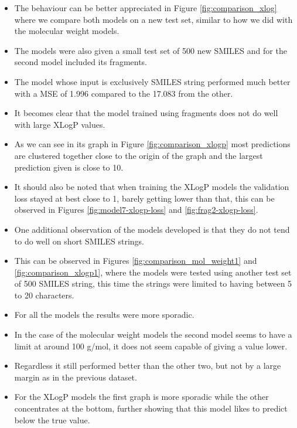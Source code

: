 \begin{itemize}
        \item The behaviour can be better appreciated in Figure \ref{fig:comparison_xlog} where we compare both models on a new test set, similar to how we did with the molecular weight models.
        \item The models were also given a small test set of 500 new SMILES and for the second model included its fragments.
        \item The model whose input is exclusively SMILES string performed much better with a MSE of 1.996 compared to the 17.083 from the other. 
        \item It becomes clear that the model trained using fragments does not do well with large XLogP values.
        \item As we can see in its graph in Figure \ref{fig:comparison_xlogp} most predictions are clustered together close to the origin of the graph and the largest prediction given is close to 10.
        \item It should also be noted that when training the XLogP models the validation loss stayed at best close to 1, barely getting lower than that, this can be observed in Figures \ref{fig:model7-xlogp-loss} and \ref{fig:frag2-xlogp-loss}.
        \item One additional observation of the models developed is that they do not tend to do well on short SMILES strings. 
        \item This can be observed in Figures \ref{fig:comparison_mol_weight1} and \ref{fig:comparison_xlogp1}, where the models were tested using another test set of 500 SMILES string, this time the strings were limited to having between 5 to 20 characters.
        \item For all the models the results were more sporadic.
        \item In the case of the molecular weight models the second model seems to have a limit at around 100 g/mol, it does not seem capable of giving a value lower.
        \item Regardless it still performed better than the other two, but not by a large margin as in the previous dataset.
        \item For the XLogP models the first graph is more sporadic while the other concentrates at the bottom, further showing that this model likes to predict below the true value. 
        
    \end{itemize}
